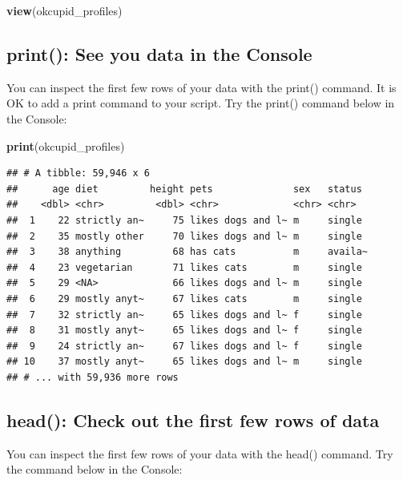 \documentclass[
]{krantz}
\makeatletter
\newenvironment{Shaded}{\begin{snugshade}}{\end{snugshade}}
\newcommand{\KeywordTok}[1]{\textcolor[rgb]{0.27,0.27,0.27}{\textbf{#1}}}
\newcommand{\NormalTok}[1]{#1}
\newenvironment{kframe}{%
\medskip{}
\setlength{\fboxsep}{.8em}
 \def\at@end@of@kframe{}%
 \ifinner\ifhmode%
  \def\at@end@of@kframe{\end{minipage}}%
  \begin{minipage}{\columnwidth}%
 \fi\fi%
 \def\FrameCommand##1{\hskip\@totalleftmargin \hskip-\fboxsep
 \colorbox{shadecolor}{##1}\hskip-\fboxsep
     \hskip-\linewidth \hskip-\@totalleftmargin \hskip\columnwidth}%
 \MakeFramed {\advance\hsize-\width
   \@totalleftmargin\z@ \linewidth\hsize
   \@setminipage}}%
 {\par\unskip\endMakeFramed%
 \at@end@of@kframe}
\renewenvironment{Shaded}{\begin{kframe}}{\end{kframe}}
\makeatother
\begin{document}
\begin{Shaded}
\begin{Highlighting}[]
\KeywordTok{view}\NormalTok{(okcupid_profiles)}
\end{Highlighting}
\end{Shaded}

\hypertarget{print-see-you-data-in-the-console}{%
\subsection{print(): See you data in the Console}\label{print-see-you-data-in-the-console}}

You can inspect the first few rows of your data with the print() command. It is OK to add a print command to your script. Try the print() command below in the Console:

\begin{Shaded}
\begin{Highlighting}[]
\KeywordTok{print}\NormalTok{(okcupid_profiles)}
\end{Highlighting}
\end{Shaded}

\begin{verbatim}
## # A tibble: 59,946 x 6
##      age diet         height pets              sex   status 
##    <dbl> <chr>         <dbl> <chr>             <chr> <chr>  
##  1    22 strictly an~     75 likes dogs and l~ m     single 
##  2    35 mostly other     70 likes dogs and l~ m     single 
##  3    38 anything         68 has cats          m     availa~
##  4    23 vegetarian       71 likes cats        m     single 
##  5    29 <NA>             66 likes dogs and l~ m     single 
##  6    29 mostly anyt~     67 likes cats        m     single 
##  7    32 strictly an~     65 likes dogs and l~ f     single 
##  8    31 mostly anyt~     65 likes dogs and l~ f     single 
##  9    24 strictly an~     67 likes dogs and l~ f     single 
## 10    37 mostly anyt~     65 likes dogs and l~ m     single 
## # ... with 59,936 more rows
\end{verbatim}

\hypertarget{head-check-out-the-first-few-rows-of-data}{%
\subsection{head(): Check out the first few rows of data}\label{head-check-out-the-first-few-rows-of-data}}

You can inspect the first few rows of your data with the head() command. Try the command below in the Console:
\end{document}
